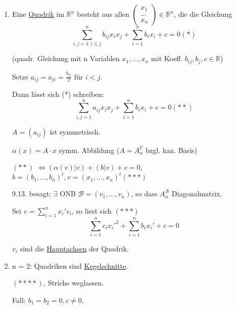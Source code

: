 \documentclass[a4paper, openany]{book}
\begin{document}
        \begin{enumerate}[label=(\alph*)]
          \item Eine \underline{Quadrik} im $\mathbb{R}^n$ besteht aus allen $\begin{pmatrix}x_1 \\ ... \\ x_n \end{pmatrix} \in \mathbb{R}^n$, die die Gleichung \[ \sum_{i,j=1; i \le j}^{n} b_{ij} x_i x_j + \sum_{i=1}^n b_i x_i + c = 0 (*)\]

          (quadr. Gleichung mit n Variablen $x_1, ..., x_n$ mit Koeff. $b_{ij}, b_j, c \in \mathbb{R}$)

          \par \medskip

          Setze $a_{ij} = a_{ji} = \frac{b_{ij}}{2}$ für $i < j$.

          Dann lässt sich (*) schreiben: \[ \sum_{i,j = 1}^n a_{ij} x_ix_j + \sum_{i=1}^n b_ix_i + c = 0(**)\]

          $A = (a_{ij})$ ist symmetrisch.

          \par \medskip

          $\alpha(x) = A \cdot x $ symm. Abbildung ($A = A_{\alpha}^{\mathcal{C}}$ bzgl. kan. Basis)

          \par \medskip

          $(**)$ $\Leftrightarrow (\alpha(v) | v) + (b|v) + c = 0$, $b = (b_1, ..., b_n)^t, v = (x_1, ..., x_n)^t (***)$

          \par \medskip

          9.13. besagt: $\exists$ ONB $\mathcal{B} = (v_1, ..., v_n)$, so dass $A_{\alpha}^{\mathcal{B}}$ Diagonalmatrix.

          \par \medskip

          Sei $v = \sum_{i=1}^n x_i' v_i$, so liest sich $(***)$ \[ \sum_{i=1}^n c_i x_i'^2 + \sum_{i=1}^n b_ix_i' + c = 0 \]

          $v_i$ sind die \underline{Hauptachsen} der Quadrik.

          \item n = 2: Quadriken sind \underline{Kegelschnitte}.

          $(****)$, Striche weglassen.

          Fall: $b_1 = b_2 = 0, c \neq 0$.


\end{enumerate}
\end{document}
